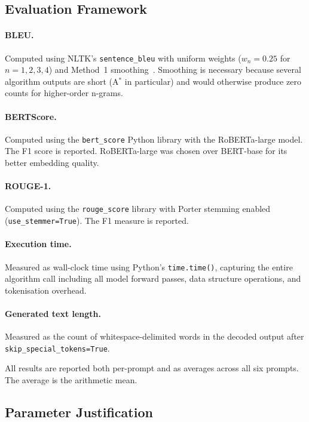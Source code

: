 \documentclass[12pt]{article}
\begin{document}
	\subsection{Evaluation Framework}
	
	\paragraph{BLEU.} Computed using NLTK's \texttt{sentence\_bleu} with uniform weights ($w_n = 0.25$ for $n = 1, 2, 3, 4$) and Method~1 smoothing~\cite{chen2014bleu_smooth}. Smoothing is necessary because several algorithm outputs are short (A$^*$ in particular) and would otherwise produce zero counts for higher-order n-grams.
	
	\paragraph{BERTScore.} Computed using the \texttt{bert\_score} Python library with the RoBERTa-large model. The F1 score is reported. RoBERTa-large was chosen over BERT-base for its better embedding quality.
	
	\paragraph{ROUGE-1.} Computed using the \texttt{rouge\_score} library with Porter stemming enabled (\texttt{use\_stemmer=True}). The F1 measure is reported.
	
	\paragraph{Execution time.} Measured as wall-clock time using Python's \texttt{time.time()}, capturing the entire algorithm call including all model forward passes, data structure operations, and tokenisation overhead.
	
	\paragraph{Generated text length.} Measured as the count of whitespace-delimited words in the decoded output after \texttt{skip\_special\_tokens=True}.
	
	All results are reported both per-prompt and as averages across all six prompts. The average is the arithmetic mean.
	
	\subsection{Parameter Justification}
	
\end{document}
